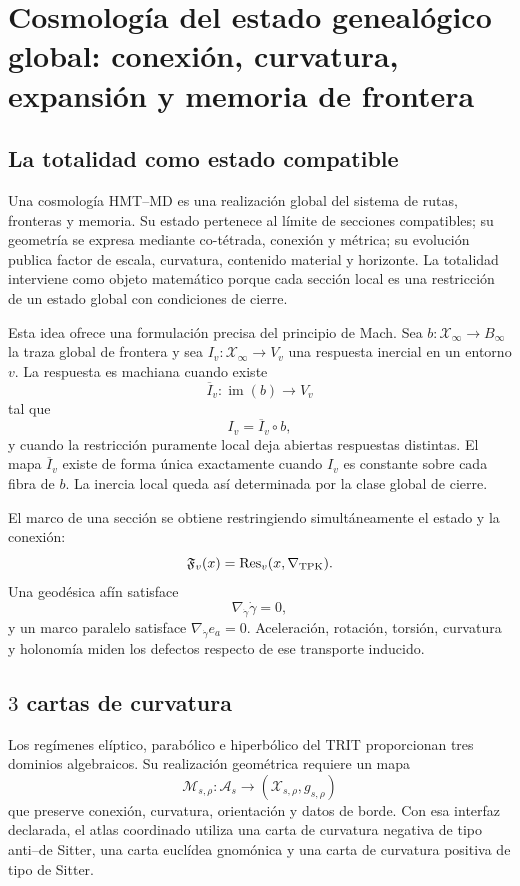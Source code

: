 \chapter{Cosmología del estado genealógico global: conexión, curvatura, expansión y memoria de frontera}
\label{chap:cosmologia}

\section{La totalidad como estado compatible}

Una cosmología HMT--MD es una realización global del sistema de rutas,
fronteras y memoria. Su estado pertenece al límite de secciones compatibles;
su geometría se expresa mediante co-tétrada, conexión y métrica; su evolución
publica factor de escala, curvatura, contenido material y horizonte. La
totalidad interviene como objeto matemático porque cada sección local es una
restricción de un estado global con condiciones de cierre.

Esta idea ofrece una formulación precisa del principio de Mach. Sea
\(b:\mathcal X_\infty\to B_\infty\) la traza global de frontera y sea
\(I_v:\mathcal X_\infty\to V_v\) una respuesta inercial en un entorno
\(v\). La respuesta es machiana cuando existe
\[
 \overline I_v:\operatorname{im}(b)\to V_v
\]
tal que
\[
 I_v=\overline I_v\circ b,
\]
y cuando la restricción puramente local deja abiertas respuestas distintas.
El mapa \(\overline I_v\) existe de forma única exactamente cuando
\(I_v\) es constante sobre cada fibra de \(b\). La inercia local queda así
determinada por la clase global de cierre.

El marco de una sección se obtiene restringiendo simultáneamente el estado y
la conexión:
\[
 \mathfrak F_v(x)
 =\operatorname{Res}_v(x,\nabla_{\rm TPK}).
\]
Una geodésica afín satisface
\[
 \nabla_{\dot\gamma}\dot\gamma=0,
\]
y un marco paralelo satisface
\(\nabla_{\dot\gamma}e_a=0\). Aceleración, rotación, torsión, curvatura y
holonomía miden los defectos respecto de ese transporte inducido.

\section{\(3\) cartas de curvatura}

Los regímenes elíptico, parabólico e hiperbólico del TRIT proporcionan tres
dominios algebraicos. Su realización geométrica requiere un mapa
\[
 \mathcal M_{s,\rho}:\mathcal A_s
 \longrightarrow(\mathcal X_{s,\rho},g_{s,\rho})
\]
que preserve conexión, curvatura, orientación y datos de borde. Con esa
interfaz declarada, el atlas coordinado utiliza una carta de curvatura
negativa de tipo anti--de Sitter, una carta euclídea gnomónica y una carta de
curvatura positiva de tipo de Sitter.

